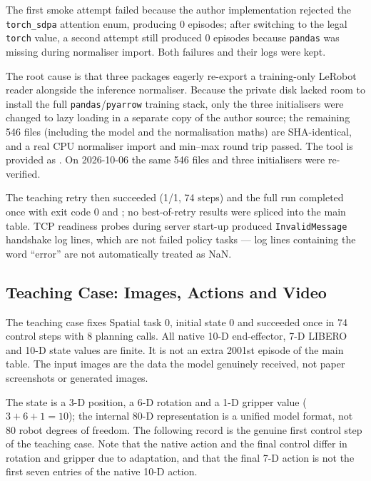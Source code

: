The first smoke attempt failed because the author implementation rejected the
\texttt{torch\_sdpa} attention enum, producing 0 episodes; after switching to
the legal \texttt{torch} value, a second attempt still produced 0 episodes
because \texttt{pandas} was missing during normaliser import. Both failures and
their logs were kept.

The root cause is that three packages eagerly re-export a training-only LeRobot
reader alongside the inference normaliser. Because the private disk lacked room
to install the full \texttt{pandas}/\texttt{pyarrow} training stack, only the
three initialisers were changed to lazy loading in a separate copy of the
author source; the remaining 546 files (including the model and the
normalisation maths) are SHA-identical, and a real CPU normaliser import and
min--max round trip passed. The tool is provided as
.
On 2026-10-06 the same 546 files and three initialisers were re-verified.

The teaching retry then succeeded (1/1, 74 steps) and the full run completed
once with exit code 0 and ;
no best-of-retry results were spliced into the main table. TCP readiness
probes during server start-up produced \texttt{InvalidMessage} handshake log
lines, which are not failed policy tasks --- log lines containing the word
``error'' are not automatically treated as NaN.

\subsection{Teaching Case: Images, Actions and Video}
\label{sec:owa-case}

The teaching case fixes Spatial task 0, initial state 0 and succeeded once in 74
control steps with 8 planning calls. All native 10-D end-effector, 7-D LIBERO
and 10-D state values are finite. It is not an extra 2001st episode of the main
table. The input images are the data the model genuinely received, not paper
screenshots or generated images.

The state is a 3-D position, a 6-D rotation and a 1-D gripper value
($3 + 6 + 1 = 10$); the internal 80-D representation is a unified model format,
not 80 robot degrees of freedom. The following record is the genuine first
control step of the teaching case. Note that the native action and the final
control differ in rotation and gripper due to adaptation, and that the final
7-D action is not the first seven entries of the native 10-D action.

